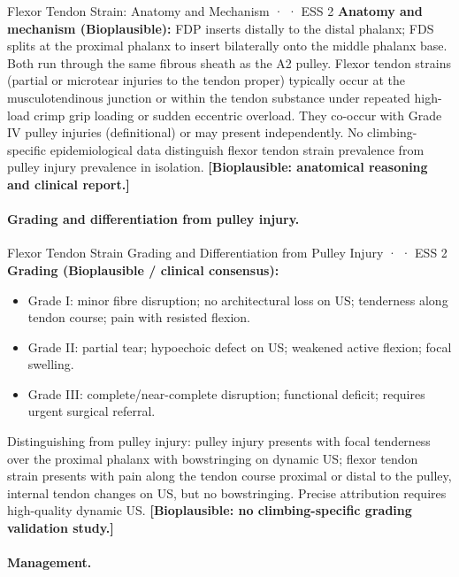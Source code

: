 \begin{bioplausbox}{Flexor Tendon Strain: Anatomy and Mechanism · \bioplausible · ESS 2}
\textbf{Anatomy and mechanism (Bioplausible):} FDP inserts distally to the distal phalanx; FDS splits at the proximal phalanx to insert bilaterally onto the middle phalanx base. Both run through the same fibrous sheath as the A2 pulley. Flexor tendon strains (partial or microtear injuries to the tendon proper) typically occur at the musculotendinous junction or within the tendon substance under repeated high-load crimp grip loading or sudden eccentric overload. They co-occur with Grade IV pulley injuries (definitional) or may present independently. No climbing-specific epidemiological data distinguish flexor tendon strain prevalence from pulley injury prevalence in isolation. \textbf{[Bioplausible: anatomical reasoning and clinical report.]}
\end{bioplausbox}

\paragraph{Grading and differentiation from pulley injury.}\leavevmode

\begin{bioplausbox}{Flexor Tendon Strain Grading and Differentiation from Pulley Injury · \bioplausible · ESS 2}
\textbf{Grading (Bioplausible / clinical consensus):}
\begin{itemize}[leftmargin=1.5em,noitemsep]
  \item Grade I: minor fibre disruption; no architectural loss on US; tenderness along tendon course; pain with resisted flexion.
  \item Grade II: partial tear; hypoechoic defect on US; weakened active flexion; focal swelling.
  \item Grade III: complete/near-complete disruption; functional deficit; requires urgent surgical referral.
\end{itemize}
Distinguishing from pulley injury: pulley injury presents with focal tenderness over the proximal phalanx with bowstringing on dynamic US; flexor tendon strain presents with pain along the tendon course proximal or distal to the pulley, internal tendon changes on US, but no bowstringing. Precise attribution requires high-quality dynamic US. \textbf{[Bioplausible: no climbing-specific grading validation study.]}
\end{bioplausbox}

\paragraph{Management.}\leavevmode

